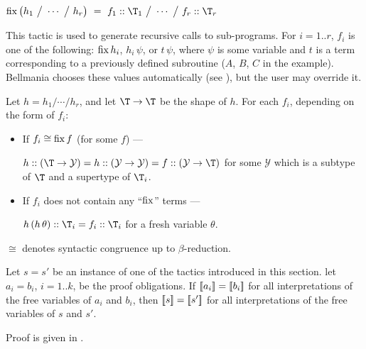 
\vspace{.1em}
 \label{tactics:Synth}
$\fix\big(h_1 ~\big/~ \cdots ~\big/~ h_r\big) ~=~ 
  f_1 :: \T_1 ~\big/~ \cdots ~\big/~ f_r :: \T_r$

This tactic is used to generate recursive calls to sub-programs. For $i=1..r$, $f_i$
is one of the following: $\operatorname{fix} h_i$, $h_i\,\psi$, or $t\,\psi$, where $\psi$ is some
variable and $t$ is a term corresponding to a previously defined subroutine
($A$, $B$, $C$ in the example).
Bellmania chooses these values automatically (see ),
but the user may override it.

\newcommand\Y{\mathcal{Y}}

\Obligations Let $h=h_1/\cdots/h_r$, and let $\T\to\T$ be the shape of $h$. 
  For each $f_i$, depending on the form of $f_i$:
\begin{itemize}
  \item If $f_i \cong \operatorname{fix} f$ (for some $f$) --- \\
    \rule{0pt}{12pt}
    $h :: (\T \to \Y) = h :: (\Y \to \Y) = f :: (\Y \to \T)$
    for some $\Y$ which is a subtype of $\T$ and a supertype of $\T_i$.
  \item If $f_i$ does not contain any ``$\operatorname{fix}$'' terms ---\\
    \rule{0pt}{12pt}
    $h\,(h\,\theta) :: \T_i = f_i :: \T_i$ for a fresh variable $\theta$.
\end{itemize}

$\cong$ denotes syntactic congruence up to $\beta$-reduction.

\bigskip
\begin{theorem}
Let $s=s'$ be an instance of one of the tactics introduced in this section.
let $a_i=b_i$, $i=1..k$, be the proof obligations. If $[\![{a_i}]\!]=[\![{b_i}]\!]$
for all interpretations of the free variables of $a_i$ and $b_i$, then
$[\![{s}]\!]=[\![{s'}]\!]$ for all interpretations of the free variables of $s$ and $s'$.
\end{theorem}

Proof is given in .


\newenvironment{tacticbox}[1]{\begin{center}
  \begin{tabular}{|@{~~~~}l@{~~~~}|}\hline
    \rule{0pt}{2.3ex}\underline{\sf \,#1\,}\\[.4em]$}
  {$\\[-1em] \\[.3ex] \hline \end{tabular} \end{center}}

